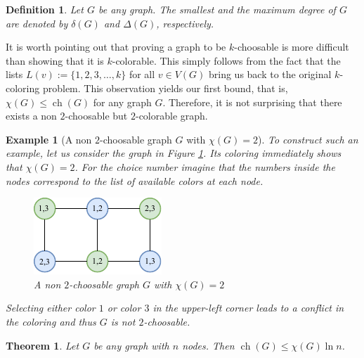 \documentclass[a4paper, 12pt]{article}
\newtheorem{theo}[lem]{Theorem}
\newtheorem{defin}[lem]{Definition}
\newtheorem{example}[lem]{Example}
\DeclareMathOperator*{\ch}{ch}
\begin{document}
\begin{defin} Let $G$ be any graph. The smallest and the maximum degree of $G$ are denoted by $\delta(G)$ and $\Delta(G)$, respectively.
\end{defin}
It is worth pointing out that proving a graph to be $k$-choosable is more difficult than showing that it is $k$-colorable. This simply follows from the fact that the lists $L(v):=\lbrace 1,2,3,\ldots,k\rbrace$ for all $v \in V(G)$ bring us back to the original $k$-coloring problem. This observation yields our first bound, that is, $\chi(G) \leqslant \ch(G)$ for any graph $G$. Therefore, it is not surprising that there exists a non $2$-choosable but $2$-colorable graph.
\begin{example}[A non $2$-choosable graph $G$ with $\chi(G)=2$]\label{ex:2-colorable-ch3}
To construct such an example, let us consider the graph in Figure \ref{fig:2-colorable-ch3}. Its coloring immediately shows that $\chi(G)=2$. For the choice number imagine that the numbers inside the nodes correspond to the list of available colors at each node.
\begin{figure}[!h]
\centering
\includegraphics[scale=1.7]{figures/2-colorable-3ch.pdf}
\caption{A non $2$-choosable graph $G$ with $\chi(G)=2$}\label{fig:2-colorable-ch3}
\end{figure}
Selecting either color $1$ or color $3$ in the upper-left corner leads to a conflict in the coloring and thus $G$ is not $2$-choosable.
\end{example}
\begin{theo}\label{theo:logarithm-bound}
Let $G$ be any graph with $n$ nodes. Then $\ch(G) \leqslant \chi(G) \ln{n}$.
\end{theo}
\end{document}
